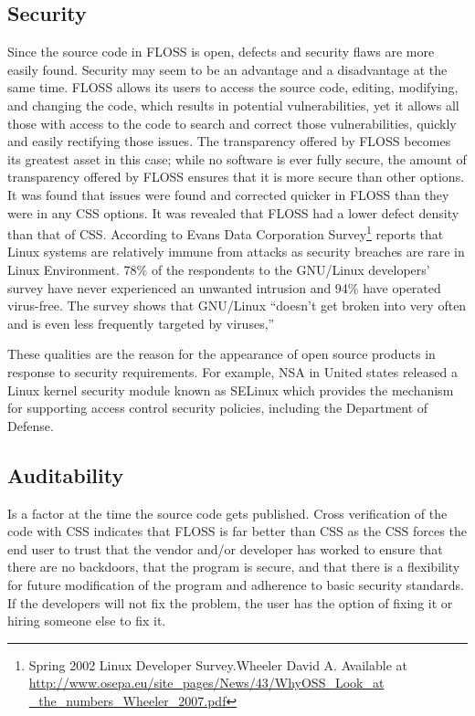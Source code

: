  \subsection{Security }
 Since the source code in FLOSS is open, defects and security flaws are more easily found.	Security may seem to be an advantage and a disadvantage at the same time. FLOSS allows its users to access the source code, editing, modifying, and changing the code, which results in potential vulnerabilities, yet it allows all those with access to the code to search and correct those vulnerabilities, quickly and easily rectifying those issues. The transparency offered by FLOSS becomes its greatest asset in this case; while no software is ever fully secure, the amount of transparency offered by FLOSS ensures that it is more secure than other options. It was found that issues were found and corrected quicker in FLOSS than they were in any CSS options. It was revealed that FLOSS had a lower defect density than that of CSS.
 	According to Evans Data Corporation Survey\footnote{Spring 2002 Linux Developer Survey.Wheeler David A. Available at \url{http://www.osepa.eu/site\_pages/News/43/WhyOSS\_Look\_at \_the\_numbers\_Wheeler\_2007.pdf}} reports that Linux systems are relatively immune from attacks as security breaches are rare in Linux Environment. 78\% of the respondents to the GNU/Linux developers’ survey have never experienced an unwanted intrusion and 94\% have operated virus-free. The survey shows that GNU/Linux “doesn’t get broken into very often and is even less frequently targeted by viruses,”
 	
 	These qualities are the reason for the appearance of open source products in response to security requirements. For example, \ac{NSA} in United states released a Linux kernel security module known as \ac{SELinux} which provides the mechanism for supporting access control security policies, including the Department of Defense.
   \subsection {Auditability}
   
   Is a factor at the time the source code gets published. Cross verification of the code with  CSS indicates that FLOSS is far better than CSS as the CSS forces the end user to trust that the vendor and/or developer has worked to ensure that there are no backdoors, that the program is secure, and that there is a flexibility for future modification of the program and adherence to basic security standards. If the developers will not fix the problem, the user has the option of fixing it or hiring someone else to fix it. 
   
